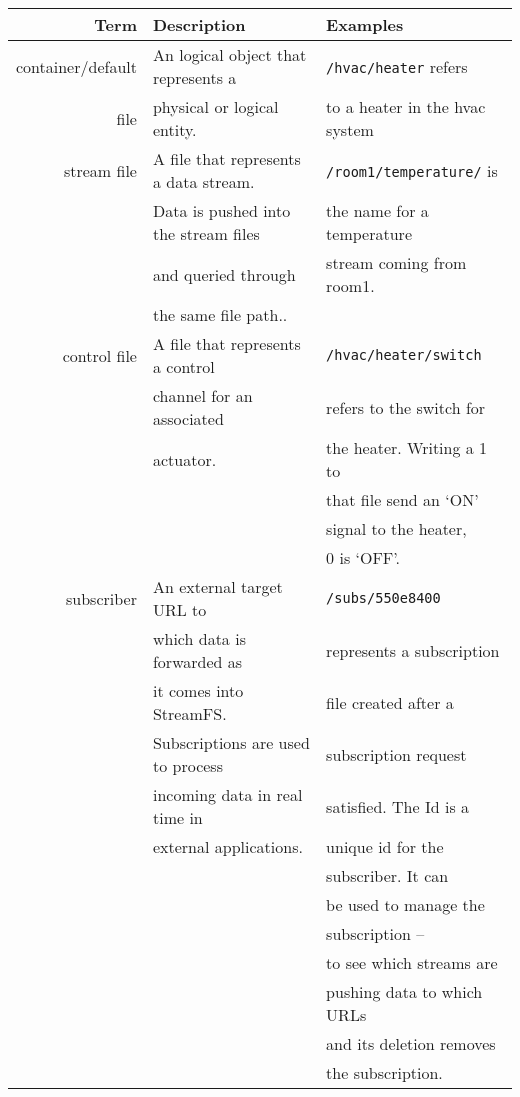\begin{table}[h!]
\begin{center}
\begin{tabular}{| r | l | l |}
	\hline
	\textbf{Term} & \textbf{Description} & \textbf{Examples}\\ \hline


	container/default & An logical object that represents a & \texttt{/hvac/heater} refers  \\ 
				 file & physical or logical entity.    	 & to a heater in the hvac system \\ \hline

	stream file & A file that represents a data stream.  	& \texttt{/room1/temperature/} is  \\
				& Data is pushed into the stream files      & the name for a temperature \\
				&  and queried through 						& stream coming from room1.\\
				& the same file path..    					& 							\\		 \hline

	control file & A file that represents a control  & \texttt{/hvac/heater/switch}    \\
				 & 	channel for an associated 		 & refers to the switch for        \\
				 &	actuator.						 & the heater.  Writing a 1 to    \\
				 &   								 & that file send an `ON'          \\
                 &                                   & signal to the heater,           \\ 
                 &                                   & 0 is `OFF'. \\ \hline

	subscriber 	& An external target URL to  				& \texttt{/subs/550e8400}  \\
				& which data is forwarded as  				& represents a subscription  \\
			   	& it comes into StreamFS.                	& file created after a   		\\
			   	& Subscriptions are used to process  		& subscription request  		\\
			   	& incoming data in real time in  	 		& satisfied. The Id is a \\
			   	& external applications.					& unique id for the  \\
			   	&											& subscriber. It can \\
			   	& 											& be used to manage the   	\\
			   	&											& subscription -- 			\\ 
                &                                           & to see which streams are \\
                &                                           & pushing data to which URLs \\
                &                                           & and its deletion removes \\
                &                                           & the subscription. \\ \hline


\end{tabular}
\end{center}
\end{table}
